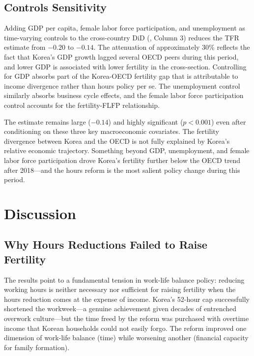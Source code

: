 \documentclass[12pt]{article}
\begin{document}
\subsection{Controls Sensitivity}

Adding GDP per capita, female labor force participation, and unemployment as time-varying controls to the cross-country DiD (, Column 3) reduces the TFR estimate from $-0.20$ to $-0.14$. The attenuation of approximately 30\% reflects the fact that Korea's GDP growth lagged several OECD peers during this period, and lower GDP is associated with lower fertility in the cross-section. Controlling for GDP absorbs part of the Korea-OECD fertility gap that is attributable to income divergence rather than hours policy per se. The unemployment control similarly absorbs business cycle effects, and the female labor force participation control accounts for the fertility-FLFP relationship.

The estimate remains large ($-0.14$) and highly significant ($p < 0.001$) even after conditioning on these three key macroeconomic covariates. The fertility divergence between Korea and the OECD is not fully explained by Korea's relative economic trajectory. Something beyond GDP, unemployment, and female labor force participation drove Korea's fertility further below the OECD trend after 2018---and the hours reform is the most salient policy change during this period.


\section{Discussion}

\subsection{Why Hours Reductions Failed to Raise Fertility}

The results point to a fundamental tension in work-life balance policy: reducing working hours is neither necessary nor sufficient for raising fertility when the hours reduction comes at the expense of income. Korea's 52-hour cap successfully shortened the workweek---a genuine achievement given decades of entrenched overwork culture---but the time freed by the reform was purchased with overtime income that Korean households could not easily forgo. The reform improved one dimension of work-life balance (time) while worsening another (financial capacity for family formation).
\end{document}
